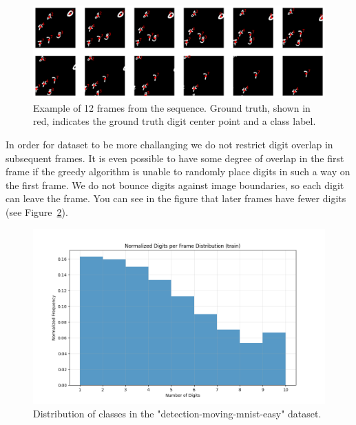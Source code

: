 \begin{figure}
    \centering
    \includegraphics[width=\textwidth]{figures/figure_methods_dataset_detection_mmnist_sequence.png}
    \caption{Example of 12 frames from the sequence. Ground truth, shown in red, indicates the ground truth digit center point and a class label.}
    \label{fig:figure_methods_dataset_detection_mmnist_sequence}
\end{figure}


In order for dataset to be more challanging we do not restrict digit overlap in subsequent frames. It is even possible to have some degree of overlap in the first frame if the greedy algorithm is unable to randomly place digits in such a way on the first frame. We do not bounce digits against image boundaries, so each digit can leave the frame. You can see in the figure that later frames have fewer digits (see Figure~\ref{fig:figure_method_dataset_train_digits_per_frame}).

\begin{figure}
    \centering
    \includegraphics[width=\textwidth]{figures/figure_method_dataset_train_digits_per_frame.png}
    \caption{Distribution of classes in the "detection-moving-mnist-easy" dataset.}
    \label{fig:figure_method_dataset_train_digits_per_frame}
\end{figure}

